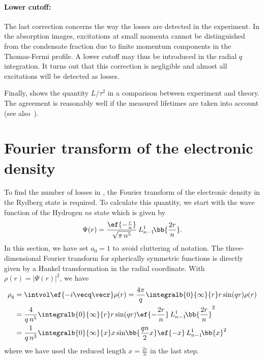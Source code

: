 \paragraph{Lower cutoff:}
The last correction concerns the way the losses are detected in the experiment. In the absorption images, excitations at small momenta cannot be distinguished from the condensate fraction due to finite momentum components in the Thomas-Fermi profile. A lower cutoff may thus be introduced in the radial $q$ integration. It turns out that this correction is negligible and almost all excitations will be detected as losses.

\bigskip
Finally,  shows the quantity $L/\tau^2$ in a comparison between experiment and theory. The agreement is reasonably well if the measured lifetimes are taken into account (see also~).


\section{Fourier transform of the electronic density}
To find the number of losses in , the Fourier transform of the electronic density in the Rydberg state is required. To calculate this quantity, we start with the wave function of the Hydrogen $n$s state which is given by
\begin{align}
\Psi(r)=\frac{\ef{-\frac{r}{n}}}{\sqrt{\pi\, n^5}} \, L_{n-1}^1\!\bb{\frac{2 r}{n}}.
\end{align}
In this section, we have set $a_0=1$ to avoid cluttering of notation.
The three-dimensional Fourier transform for spherically symmetric functions is directly given by a Hankel transformation in the radial coordinate. With $\rho(r)=|\Psi(r)|^2$, we have
\begin{align}
    \rho_q&=\intvol \ef{-i \vecq \vecr} \rho(r) =\frac{4\pi}{q}\integralb{0}{\infty}{r} r \sin(qr) \rho(r) \\
    &=\frac{4}{q\,n^5}\integralb{0}{\infty}{r} r \sin(qr) \ef{-\frac{2r}{n}} \, L_{n-1}^1\!\bb{\frac{2 r}{n}}^2 \\
    &=\frac{1}{q\,n^3}\integralb{0}{\infty}{x} x \sin\!\bb{\frac{qn}{2}x} \ef{-x} \, L_{n-1}^1\!\bb{x}^2
\end{align}
where we have used the reduced length $x=\frac{2r}{n}$ in the last step.
